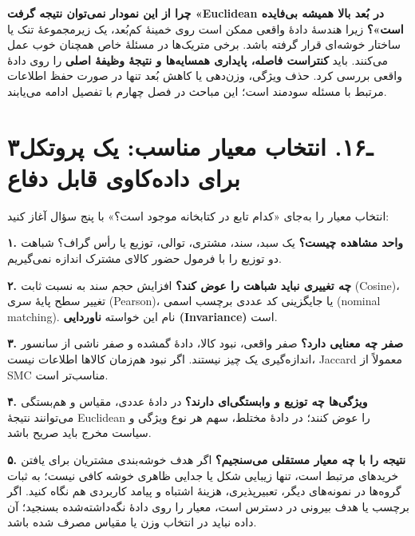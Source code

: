 \documentclass[12pt,a4paper,oneside]{book}
\begin{document}
\textbf{چرا از این نمودار نمی‌توان نتیجه گرفت «Euclidean در بُعد بالا همیشه بی‌فایده است»؟} زیرا هندسهٔ دادهٔ واقعی ممکن است روی خمینهٔ کم‌بُعد، یک زیرمجموعهٔ تنک یا ساختار خوشه‌ای قرار گرفته باشد. برخی متریک‌ها در مسئلهٔ خاص همچنان خوب عمل می‌کنند. باید \textbf{کنتراست فاصله، پایداری همسایه‌ها و نتیجهٔ وظیفهٔ اصلی} را روی دادهٔ واقعی بررسی کرد. حذف ویژگی، وزن‌دهی یا کاهش بُعد تنها در صورت حفظ اطلاعات مرتبط با مسئله سودمند است؛ این مباحث در فصل چهارم با تفصیل ادامه می‌یابند.

\section{۳ـ۱۶. انتخاب معیار مناسب: یک پروتکل برای داده‌کاوی قابل دفاع}\label{ux640ux6f1ux6f6.-ux627ux646ux62aux62eux627ux628-ux645ux639ux6ccux627ux631-ux645ux646ux627ux633ux628-ux6ccux6a9-ux67eux631ux648ux62aux6a9ux644-ux628ux631ux627ux6cc-ux62fux627ux62fux647ux6a9ux627ux648ux6cc-ux642ux627ux628ux644-ux62fux641ux627ux639}

انتخاب معیار را به‌جای «کدام تابع در کتابخانه موجود است؟» با پنج سؤال آغاز کنید:

\textbf{۱. واحد مشاهده چیست؟} یک سبد، سند، مشتری، توالی، توزیع یا رأس گراف؟ شباهت دو توزیع را با فرمول حضور کالای مشترک اندازه نمی‌گیریم.

\textbf{۲. چه تغییری نباید شباهت را عوض کند؟} افزایش حجم سند به نسبت ثابت (Cosine)، تغییر سطح پایهٔ سری (Pearson)، یا جایگزینی کد عددی برچسب اسمی (nominal matching). نام این خواسته \textbf{ناوردایی (Invariance)} است.

\textbf{۳. صفر چه معنایی دارد؟} صفر واقعی، نبود کالا، دادهٔ گمشده و صفر ناشی از سانسور اندازه‌گیری یک چیز نیستند. اگر نبود هم‌زمان کالاها اطلاعات نیست، Jaccard معمولاً از SMC مناسب‌تر است.

\textbf{۴. ویژگی‌ها چه توزیع و وابستگی‌ای دارند؟} در دادهٔ عددی، مقیاس و هم‌بستگی می‌توانند نتیجهٔ Euclidean را عوض کنند؛ در دادهٔ مختلط، سهم هر نوع ویژگی و سیاست مخرج باید صریح باشد.

\textbf{۵. نتیجه را با چه معیار مستقلی می‌سنجیم؟} اگر هدف خوشه‌بندی مشتریان برای یافتن خریدهای مرتبط است، تنها زیبایی شکل یا جدایی ظاهری خوشه کافی نیست؛ به ثبات گروه‌ها در نمونه‌های دیگر، تعبیرپذیری، هزینهٔ اشتباه و پیامد کاربردی هم نگاه کنید. اگر برچسب یا هدف بیرونی در دسترس است، معیار را روی دادهٔ نگه‌داشته‌شده بسنجید؛ آن داده نباید در انتخاب وزن یا مقیاس مصرف شده باشد.
\end{document}
